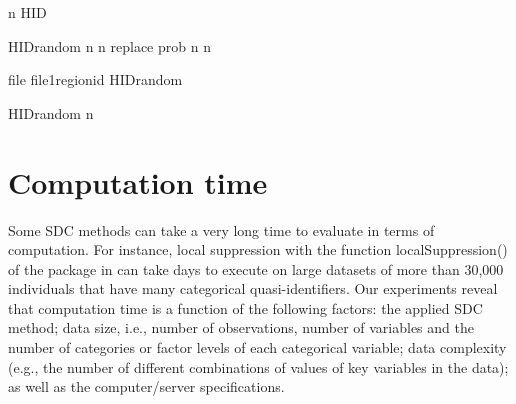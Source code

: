 \documentclass[letterpaper,10pt,english]{sphinxmanual}
\begin{document}
\def\sphinxLiteralBlockLabel{\label{\detokenize{sdcMicro:code716}}}
%
\begin{sphinxVerbatim}[commandchars=\\\{\},numbers=left,firstnumber=1,stepnumber=1]
n  HID 

 
HIDrandom  n n replace   prob  n n

file  file1\PYG{p}{[}regionid HIDrandom\PYG{p}{]}

HIDrandom  n
\end{sphinxVerbatim}


\section{Computation time}
\label{\detokenize{sdcMicro:computation-time}}
Some SDC methods can take a very long time to evaluate in terms of
computation. For instance, local suppression with the function
localSuppression() of the  package in  can take days to
execute on large datasets of more than 30,000 individuals that have many
categorical quasi-identifiers. Our experiments reveal that computation
time is a function of the following factors: the applied SDC method;
data size, i.e., number of observations, number of variables and the
number of categories or factor levels of each categorical variable; data
complexity (e.g., the number of different combinations of values of key
variables in the data); as well as the computer/server specifications.
\end{document}
